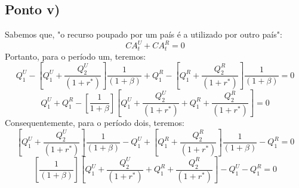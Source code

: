 \documentclass{article}
\begin{document}
\subsection*{Ponto v)}
Sabemos que, "o recurso poupado por um país é a utilizado por outro país":
\begin{equation}
    CA_t^U+CA_t^R=0
\end{equation}
Portanto, para o período um, teremos:
\begin{equation}\label{eq:3vca1}
    Q_1^{U}-\left[Q_1^{U}+\frac{Q_2^{U}}{(1+r^*)}\right]\frac{1}{(1+\beta)} +
    Q_1^{R}-\left[Q_1^{R}+\frac{Q_2^{R}}{(1+r^*)}\right]\frac{1}{(1+\beta)}=0
\end{equation}
\begin{equation}
    Q_1^{U}+Q_1^{R}-\left[\frac{1}{1+\beta}\right] \left[Q_1^{U}+\frac{Q_2^{U}}{(1+r^*)}+Q_1^{R}+\frac{Q_2^{R}}{(1+r^*)}\right]=0
\end{equation}
Consequentemente, para o período dois, teremos:
\begin{equation}
    \left[Q_1^{U}+\frac{Q_2^{U}}{(1+r^*)}\right]\frac{1}{(1+\beta)}-Q_1^{U}+
    \left[Q_1^{R}+\frac{Q_2^{R}}{(1+r^*)}\right]\frac{1}{(1+\beta)}-Q_1^{R}=0
\end{equation}
\begin{equation}
    \left[\frac{1}{(1+\beta)}\right]\left[Q_1^{U}+\frac{Q_2^{U}}{(1+r^*)}+Q_1^{R}+\frac{Q_2^{R}}{(1+r^*)}\right]-Q_1^{U}-Q_1^{R}=0
\end{equation}
\end{document}
